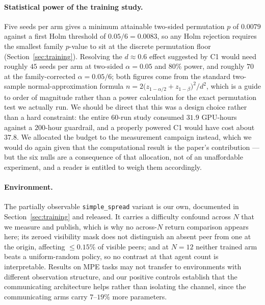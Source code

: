 \paragraph{Statistical power of the training study.} Five seeds per arm gives a
minimum attainable two-sided permutation $p$ of $0.0079$ against a first Holm
threshold of $0.05/6 = 0.0083$, so any Holm rejection requires the smallest
family $p$-value to sit at the discrete permutation floor
(Section~\ref{sec:training}).
Resolving the $d \approx 0.6$ effect suggested by C1 would need roughly $45$
seeds per arm at two-sided $\alpha = 0.05$ and $80\%$ power, and roughly $70$
at the family-corrected $\alpha = 0.05/6$; both figures come from the standard
two-sample normal-approximation formula
$n = 2\bigl(z_{1-\alpha/2}+z_{1-\beta}\bigr)^2/d^2$, which is a guide to order
of magnitude rather than a power calculation for the exact permutation test we
actually run. We should be direct that this was a
design choice rather than a hard constraint: the entire $60$-run study consumed
$31.9$ GPU-hours against a $200$-hour guardrail, and a properly powered C1
would have cost about $37.8$. We allocated the budget to the measurement
campaign instead, which we would do again given that the computational result
is the paper's contribution --- but the six nulls are a consequence of that
allocation, not of an unaffordable experiment, and a reader is entitled to
weigh them accordingly.

\paragraph{Environment.} The partially observable \texttt{simple\_spread}
variant is our own, documented in Section~\ref{sec:training} and released. It
carries a difficulty confound across $N$ that we measure and publish, which is
why no across-$N$ return comparison appears here; its zeroed visibility mask
does not distinguish an absent peer from one at the origin, affecting
$\le 0.15\%$ of visible peers; and at $N{=}12$ neither trained arm beats a
uniform-random policy, so no contrast at that agent count is interpretable.
Results on MPE tasks may not transfer to environments with different
observation structure, and our positive controls establish that the
communicating architecture helps rather than isolating the channel, since the
communicating arms carry $7$--$19\%$ more parameters.
